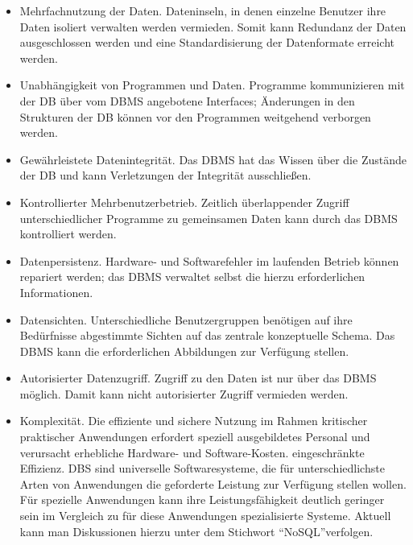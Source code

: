 \documentclass[
  11pt,
  a4paper,
  DIV=11,
  numbers=noendperiod]{scrartcl}
\begin{document}
\begin{itemize}
\item
  Mehrfachnutzung der Daten. Dateninseln, in denen einzelne Benutzer
  ihre Daten isoliert verwalten werden vermieden. Somit kann Redundanz
  der Daten ausgeschlossen werden und eine Standardisierung der
  Datenformate erreicht werden.
\item
  Unabhängigkeit von Programmen und Daten. Programme kommunizieren mit
  der DB über vom DBMS angebotene Interfaces; Änderungen in den
  Strukturen der DB können vor den Programmen weitgehend verborgen
  werden.
\item
  Gewährleistete Datenintegrität. Das DBMS hat das Wissen über die
  Zustände der DB und kann Verletzungen der Integrität ausschließen.
\item
  Kontrollierter Mehrbenutzerbetrieb. Zeitlich überlappender Zugriff
  unterschiedlicher Programme zu gemeinsamen Daten kann durch das DBMS
  kontrolliert werden.
\item
  Datenpersistenz. Hardware- und Softwarefehler im laufenden Betrieb
  können repariert werden; das DBMS verwaltet selbst die hierzu
  erforderlichen Informationen.
\item
  Datensichten. Unterschiedliche Benutzergruppen benötigen auf ihre
  Bedürfnisse abgestimmte Sichten auf das zentrale konzeptuelle Schema.
  Das DBMS kann die erforderlichen Abbildungen zur Verfügung stellen.
\item
  Autorisierter Datenzugriff. Zugriff zu den Daten ist nur über das DBMS
  möglich. Damit kann nicht autorisierter Zugriff vermieden werden.
\item
  Komplexität. Die effiziente und sichere Nutzung im Rahmen kritischer
  praktischer Anwendungen erfordert speziell ausgebildetes Personal und
  verursacht erhebliche Hardware- und Software-Kosten. eingeschränkte
  Effizienz. DBS sind universelle Softwaresysteme, die für
  unterschiedlichste Arten von Anwendungen die geforderte Leistung zur
  Verfügung stellen wollen. Für spezielle Anwendungen kann ihre
  Leistungsfähigkeit deutlich geringer sein im Vergleich zu für diese
  Anwendungen spezialisierte Systeme. Aktuell kann man Diskussionen
  hierzu unter dem Stichwort ``NoSQL''verfolgen.
\end{itemize}
\end{document}

